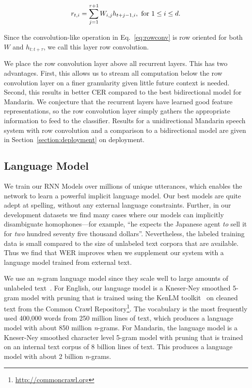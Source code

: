 \begin{align}
\label{eq:rowconv}
r_{t,i} = \sum_{j=1}^{\tau+1} W_{i,j} h_{t+j-1, i}, {\rm \ for\ } 1 \leq i \leq d.
\end{align}

Since the convolution-like operation in Eq.~\ref{eq:rowconv} is row oriented
for both $W$ and $h_{t:t+\tau}$, we call this layer row convolution.

We place the row convolution layer above all recurrent layers. This has two
advantages. First, this allows us to stream all computation below the row
convolution layer on a finer granularity given little future context is needed.
Second, this results in better CER compared to the best bidirectional model for
Mandarin. We conjecture that the recurrent layers have learned good feature
representations, so the row convolution layer simply gathers the appropriate
information to feed to the classifier. Results for a unidirectional Mandarin
speech system with row convolution and a comparison to a bidirectional model
are given in Section~\ref{section:deployment} on deployment. 

\subsection{Language Model}
\label{sec:scaling_asr:languagemodel}

We train our RNN Models over millions of unique utterances, which enables the
network to learn a powerful implicit language model. Our best models are quite
adept at spelling, without any external language constraints. Further, in our
development datasets we find many cases where our models can implicitly
disambiguate homophones---for example, ``he expects the Japanese agent
\emph{to} sell it for \emph{two} hundred seventy five thousand dollars''.
Nevertheless, the labeled training data is small compared to the size of
unlabeled text corpora that are available. Thus we find that WER improves when
we supplement our system with a language model trained from external text. 

We use an \emph{n}-gram language model since they scale well to large amounts
of unlabeled text~\cite{hannun2014deepspeech}. For English, our language model
is a Kneser-Ney smoothed 5-gram model with pruning that is trained using the
KenLM toolkit~\cite{heafield2013kenlm} on cleaned text from the Common Crawl
Repository\footnote{\url{http://commoncrawl.org}}. The vocabulary is the most
frequently used 400,000 words from 250 million lines of text, which produces a
language model with about 850 million \emph{n}-grams. For Mandarin, the
language model is a Kneser-Ney smoothed character level 5-gram model with
pruning that is trained on an internal text corpus of 8 billion lines of text.
This produces a language model with about 2 billion \emph{n}-grams.

